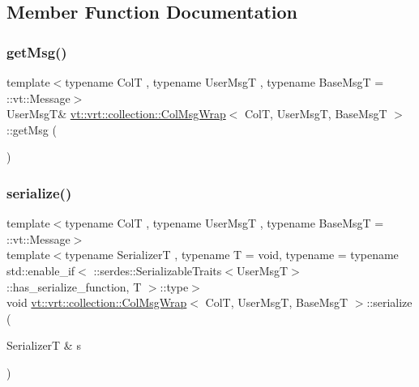 \subsection{Member Function Documentation}
\mbox{\label{structvt_1_1vrt_1_1collection_1_1_col_msg_wrap_a69d30485a72651a7ede17f6bcdb13cd4}} 
\subsubsection{\texorpdfstring{get\+Msg()}{getMsg()}}
{\footnotesize\ttfamily template$<$typename ColT , typename User\+MsgT , typename Base\+MsgT  = \+::vt\+::\+Message$>$ \\
User\+MsgT\& \hyperlink{structvt_1_1vrt_1_1collection_1_1_col_msg_wrap}{vt\+::vrt\+::collection\+::\+Col\+Msg\+Wrap}$<$ ColT, User\+MsgT, Base\+MsgT $>$\+::get\+Msg (\begin{DoxyParamCaption}{ }\end{DoxyParamCaption})\hspace{0.3cm}{\ttfamily [inline]}}

\mbox{\label{structvt_1_1vrt_1_1collection_1_1_col_msg_wrap_ad225439a1358090be0ad57cb536eb1d3}} 
\subsubsection{\texorpdfstring{serialize()}{serialize()}}
{\footnotesize\ttfamily template$<$typename ColT , typename User\+MsgT , typename Base\+MsgT  = \+::vt\+::\+Message$>$ \\
template$<$typename SerializerT , typename T  = void, typename  = typename std\+::enable\+\_\+if$<$      \+::serdes\+::\+Serializable\+Traits$<$\+User\+Msg\+T$>$\+::has\+\_\+serialize\+\_\+function, T    $>$\+::type$>$ \\
void \hyperlink{structvt_1_1vrt_1_1collection_1_1_col_msg_wrap}{vt\+::vrt\+::collection\+::\+Col\+Msg\+Wrap}$<$ ColT, User\+MsgT, Base\+MsgT $>$\+::serialize (\begin{DoxyParamCaption}\item[{SerializerT \&}]{s }\end{DoxyParamCaption})\hspace{0.3cm}{\ttfamily [inline]}}

